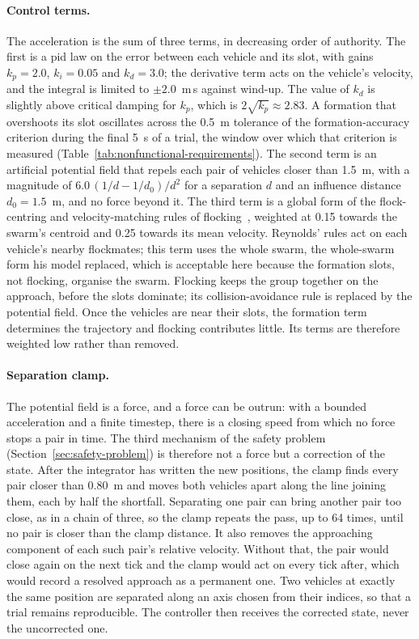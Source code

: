 \paragraph{Control terms.} The acceleration is the sum of three terms, in decreasing order of
authority. The first is a \gls{pid} law on the error between each vehicle and its slot, with
gains $k_p = 2.0$, $k_i = 0.05$ and $k_d = 3.0$; the derivative term acts on the vehicle's
velocity, and the integral is limited to $\pm 2.0$~m\,s against wind-up. The value of $k_d$ is
slightly above critical damping for $k_p$, which is $2\sqrt{k_p} \approx 2.83$. A formation that
overshoots its slot oscillates across the 0.5~m tolerance of the formation-accuracy criterion
during the final 5~s of a trial, the window over which that criterion is measured
(Table~\ref{tab:nonfunctional-requirements}). The second term is an artificial potential field
that repels each pair of vehicles closer than 1.5~m, with a magnitude of
$6.0\,(1/d - 1/d_0)/d^2$ for a separation $d$ and an influence distance $d_0 = 1.5$~m, and no force
beyond it. The third term is a global form of the flock-centring and velocity-matching rules of
flocking~\cite{reynolds1987}, weighted at 0.15 towards the swarm's centroid and 0.25 towards its
mean velocity. Reynolds' rules act on each vehicle's nearby flockmates; this term uses the whole
swarm, the whole-swarm form his model replaced, which is acceptable here because the formation
slots, not flocking, organise the swarm. Flocking keeps the group together on the approach, before
the slots dominate; its collision-avoidance rule is replaced by the potential field. Once the vehicles are near their slots, the formation term determines the
trajectory and flocking contributes little. Its terms are therefore weighted low rather than
removed.

\paragraph{Separation clamp.} The potential field is a force, and a force can be outrun: with a
bounded acceleration and a finite timestep, there is a closing speed from which no force stops a
pair in time. The third mechanism of the safety problem (Section~\ref{sec:safety-problem}) is
therefore not a force but a correction of the state. After the integrator has written the new
positions, the clamp finds every pair closer than 0.80~m and moves both vehicles apart along the
line joining them, each by half the shortfall. Separating one pair can bring another pair too
close, as in a chain of three, so the clamp repeats the pass, up to 64 times, until no pair is
closer than the clamp distance. It also removes the approaching component of each such pair's
relative velocity. Without that, the pair would close again on the next tick and the clamp would
act on every tick after, which would record a resolved approach as a permanent one. Two vehicles at
exactly the same position are separated along an axis chosen from their indices, so that a trial
remains reproducible. The controller then receives the corrected state, never the uncorrected one.

